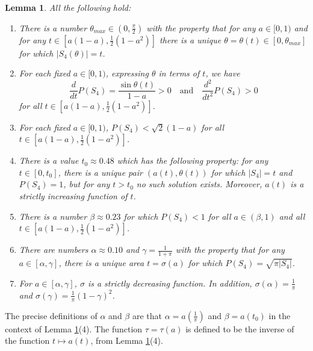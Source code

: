 \documentclass[leqno]{article}
\numberwithin{equation}{section}
\theoremstyle{definition}
\theoremstyle{remark}
\theoremstyle{plain}
\newtheorem{lemma}[equation]{Lemma}
\begin{document}
\begin{lemma}\label{lem:technical}  All the following hold:

\begin{enumerate}\item  There is a number $\theta_{max}\in (0,\tfrac{\pi}{2})$ with the property that for any $a\in [0,1)$ and for any $t\in \left[a(1-a), \frac{1}{2}(1-a^2)\right]$ there is a unique $\theta = \theta(t)\in [0,\theta_{max}]$ for which $|S_4(\theta)| = t$.

\item  For each fixed $a\in[0,1)$,  expressing $\theta$ in terms of $t$, we have $$\frac{d}{dt} P(S_4) = \frac{\sin \theta(t)}{1-a} > 0 \quad \text{and}\quad \frac{d^2}{dt^2}P(S_4) > 0$$ for all $t\in \left[a(1-a), \frac{1}{2}(1-a^2)\right].$

\item  For each fixed $a\in [0,1)$, $P(S_4) < \sqrt{2}(1-a)$ for all $t\in\left[a(1-a), \frac{1}{2}(1-a^2)\right]$.

\item  There is a value $t_0\approx 0.48$ which has the following property:  for any $t\in [0,t_0]$, there is a unique pair $(a(t),\theta(t))$ for which $|S_4| = t$ and $P(S_4) = 1$, but for any $t > t_0$ no such solution exists.  Moreover, $a(t)$ is a strictly increasing function of $t$.

\item  There is a number $\beta \approx 0.23$ for which $P(S_4) < 1$ for all $a \in (\beta,1)$ and all $t\in \left[a(1-a), \frac{1}{2}(1-a^2)\right]$.

\item  There are numbers $\alpha \approx 0.10$ and $\gamma = \frac{1}{1+\pi}$ with the property that for any $a\in [\alpha,\gamma]$, there is a unique area $t= \sigma(a)$ for which $P(S_4) = \sqrt{\pi |S_4|}$.

\item  For $a\in [\alpha,\gamma]$, $\sigma$ is a strictly decreasing function.  In addition, $\sigma(\alpha) = \frac{1}{\pi}$ and $\sigma(\gamma) = \frac{1}{\pi}(1-\gamma)^2$.  
\end{enumerate}

\end{lemma}

The precise definitions of $\alpha$ and $\beta$ are that $\alpha = a(\tfrac{1}{\pi})$ and $\beta = a(t_0)$ in the context of Lemma \ref{lem:technical}(4).  The function $\tau = \tau(a)$ is defined to be the inverse of the function $t\mapsto a(t)$, from Lemma \ref{lem:technical}(4).
\end{document}
